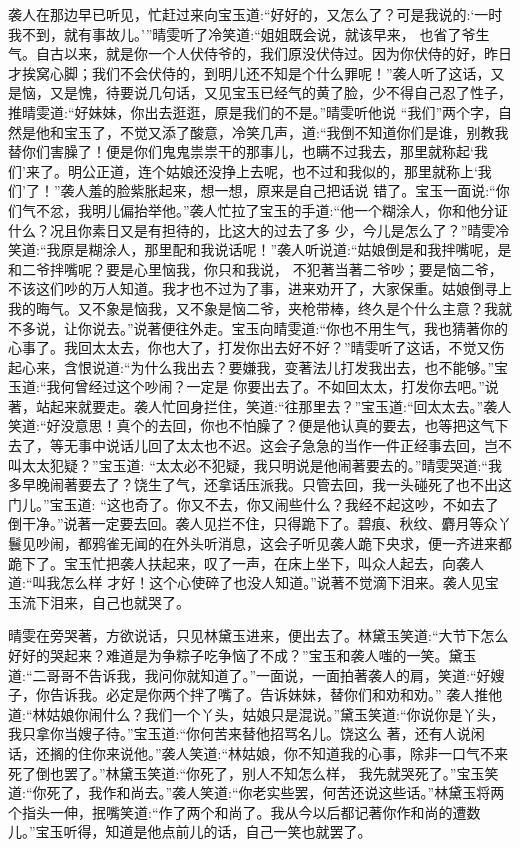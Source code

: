 \begin{parag}
    袭人在那边早已听见，忙赶过来向宝玉道:“好好的，又怎么了？可是我说的:‘一时我不到，就有事故儿。’”晴雯听了冷笑道:“姐姐既会说，就该早来， 也省了爷生气。自古以来，就是你一个人伏侍爷的，我们原没伏侍过。因为你伏侍的好，昨日才挨窝心脚；我们不会伏侍的，到明儿还不知是个什么罪呢！”袭人听了这话，又是恼，又是愧，待要说几句话，又见宝玉已经气的黄了脸，少不得自己忍了性子，推晴雯道:“好妹妹，你出去逛逛，原是我们的不是。”晴雯听他说 “我们”两个字，自然是他和宝玉了，不觉又添了酸意，冷笑几声，道:“我倒不知道你们是谁，别教我替你们害臊了！便是你们鬼鬼祟祟干的那事儿，也瞒不过我去，那里就称起‘我们’来了。明公正道，连个姑娘还没挣上去呢，也不过和我似的，那里就称上‘我们’了！”袭人羞的脸紫胀起来，想一想，原来是自己把话说 错了。宝玉一面说:“你们气不忿，我明儿偏抬举他。”袭人忙拉了宝玉的手道:“他一个糊涂人，你和他分证什么？况且你素日又是有担待的，比这大的过去了多 少，今儿是怎么了？”晴雯冷笑道:“我原是糊涂人，那里配和我说话呢！”袭人听说道:“姑娘倒是和我拌嘴呢，是和二爷拌嘴呢？要是心里恼我，你只和我说， 不犯著当著二爷吵；要是恼二爷，不该这们吵的万人知道。我才也不过为了事，进来劝开了，大家保重。姑娘倒寻上我的晦气。又不象是恼我，又不象是恼二爷，夹枪带棒，终久是个什么主意？我就不多说，让你说去。”说著便往外走。宝玉向晴雯道:“你也不用生气，我也猜著你的心事了。我回太太去，你也大了，打发你出去好不好？”晴雯听了这话，不觉又伤起心来，含恨说道:“为什么我出去？要嫌我，变著法儿打发我出去，也不能够。”宝玉道:“我何曾经过这个吵闹？一定是 你要出去了。不如回太太，打发你去吧。”说著，站起来就要走。袭人忙回身拦住，笑道:“往那里去？”宝玉道:“回太太去。”袭人笑道:“好没意思！真个的去回，你也不怕臊了？便是他认真的要去，也等把这气下去了，等无事中说话儿回了太太也不迟。这会子急急的当作一件正经事去回，岂不叫太太犯疑？”宝玉道: “太太必不犯疑，我只明说是他闹著要去的。”晴雯哭道:“我多早晚闹著要去了？饶生了气，还拿话压派我。只管去回，我一头碰死了也不出这门儿。”宝玉道: “这也奇了。你又不去，你又闹些什么？我经不起这吵，不如去了倒干净。”说著一定要去回。袭人见拦不住，只得跪下了。碧痕、秋纹、麝月等众丫鬟见吵闹，都鸦雀无闻的在外头听消息，这会子听见袭人跪下央求，便一齐进来都跪下了。宝玉忙把袭人扶起来，叹了一声，在床上坐下，叫众人起去，向袭人道:“叫我怎么样 才好！这个心使碎了也没人知道。”说著不觉滴下泪来。袭人见宝玉流下泪来，自己也就哭了。
\end{parag}


\begin{parag}
    晴雯在旁哭著，方欲说话，只见林黛玉进来，便出去了。林黛玉笑道:“大节下怎么好好的哭起来？难道是为争粽子吃争恼了不成？”宝玉和袭人嗤的一笑。黛玉道:“二哥哥不告诉我，我问你就知道了。”一面说，一面拍著袭人的肩，笑道:“好嫂子，你告诉我。必定是你两个拌了嘴了。告诉妹妹，替你们和劝和劝。” 袭人推他道:“林姑娘你闹什么？我们一个丫头，姑娘只是混说。”黛玉笑道:“你说你是丫头，我只拿你当嫂子待。”宝玉道:“你何苦来替他招骂名儿。饶这么 著，还有人说闲话，还搁的住你来说他。”袭人笑道:“林姑娘，你不知道我的心事，除非一口气不来死了倒也罢了。”林黛玉笑道:“你死了，别人不知怎么样， 我先就哭死了。”宝玉笑道:“你死了，我作和尚去。”袭人笑道:“你老实些罢，何苦还说这些话。”林黛玉将两个指头一伸，抿嘴笑道:“作了两个和尚了。我从今以后都记著你作和尚的遭数儿。”宝玉听得，知道是他点前儿的话，自己一笑也就罢了。
\end{parag}


